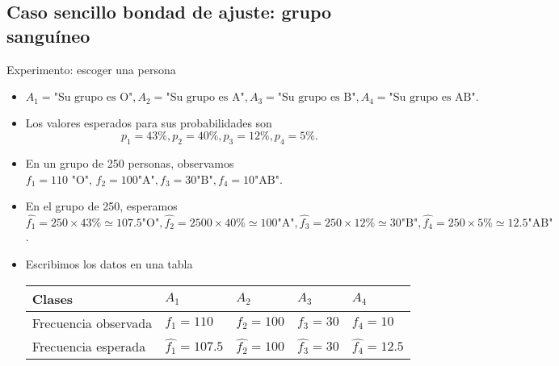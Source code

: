 \subsection*{Caso sencillo bondad de ajuste: grupo sanguíneo}
\begin{tcolorbox}[colback=blue!5!white, colframe=blue!75!black, title=\textbf{Cuatro grupos sanguíneos}]
Experimento: escoger una persona
\begin{itemize}[label=\textbullet]
    \item $A_1=\text{"Su grupo es O"},A_2=\text{"Su grupo es A"},A_3=\text{"Su grupo es B"},A_4=\text{"Su grupo es AB"}.$ 
    \item Los valores esperados para sus probabilidades son $$p_1=43\%,p_2=40\%,p_3=12\%,p_4=5\%.$$ 
    \item En un grupo de 250 personas, observamos $f_1=110\text{ "O", }f_2=100\text{"A"},f_3=30\text{"B"},f_4=10\text{"AB"}$.
    \item En el grupo de 250, esperamos $\hat{f_1}=250\times 43\%\simeq 107.5\text{"O"},\hat{f_2}=2500\times 40\%\simeq 100\text{"A"},\hat{f_3}=250\times 12\%\simeq 30\text{"B"},\hat{f_4}=250\times 5\%\simeq 12.5\text{"AB"}$.
    \item Escribimos los datos en una tabla 
        \begin{center}
            \begin{tabular}{p{2cm}llll}
                \textbf{Clases} & $A_1$ & $A_2$ & $A_3$ & $A_4$\\ \hline
                Frecuencia observada & $f_1=110$ & $f_2=100$ & $f_3=30$ & $f_4=10$\\ \hline
                Frecuencia esperada & $\hat{f_1}=107.5$ & $\hat{f_2}=100$ & $\hat{f_3}=30$ & $\hat{f_4}=12.5$
            \end{tabular}
        \end{center}
\end{itemize}
\end{tcolorbox}
